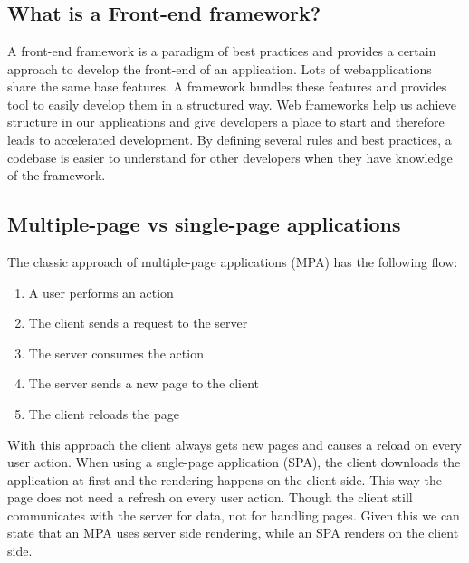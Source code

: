 \chapter{}
\label{ch:stand-van-zaken}



\section{What is a Front-end framework?}

A front-end framework is a paradigm of best practices and provides a certain approach to develop the front-end of an application.
Lots of webapplications share the same base features. A framework bundles these features and provides tool to easily develop them in a structured way. Web frameworks help us achieve structure in our applications and give developers a place to start and therefore leads to accelerated development. By defining several rules and best practices, a codebase is easier to understand for other developers when they have knowledge of the framework. \autocite{Spittel}

\section{Multiple-page vs single-page applications}

The classic approach of multiple-page applications (MPA) has the following flow:
\begin{enumerate}
    \item A user performs an action
    \item The client sends a request to the server
    \item The server consumes the action
    \item The server sends a new page to the client
    \item The client reloads the page
\end{enumerate}
With this approach the client always gets new pages and causes a reload on every user action.
When using a sngle-page application (SPA), the client downloads the application at first and the rendering happens on the client side. This way the page does not need a refresh on every user action. Though the client still communicates with the server for data, not for handling pages.
Given this we can state that an MPA uses server side rendering, while an SPA renders on the client side.
\autocite{Skolski}

